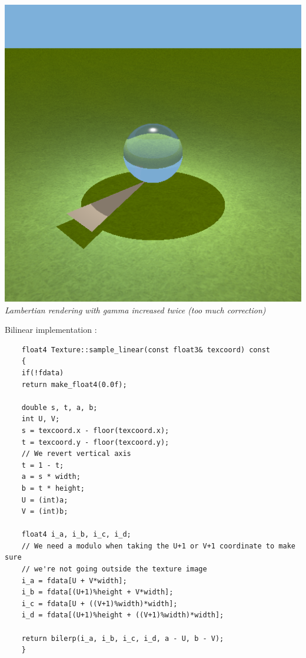 \documentclass[a4,12pt]{article}
\begin{document}
\begin{center}
\begin{minipage}[b]{0.40\linewidth}
\begin{center}
				\includegraphics[width =\textwidth]{./Worksheet3/TexturesRenderingShadowsGammaGamma.png}\\
				\textit{Lambertian rendering with gamma increased twice (too much correction)}
			\end{center}
		\end{minipage}
	\end{center}
	
	Bilinear implementation :
	\begin{lstlisting}
	float4 Texture::sample_linear(const float3& texcoord) const
	{
	if(!fdata)
	return make_float4(0.0f);
	
	double s, t, a, b;
	int U, V;
	s = texcoord.x - floor(texcoord.x);
	t = texcoord.y - floor(texcoord.y);
	// We revert vertical axis
	t = 1 - t;
	a = s * width;
	b = t * height;
	U = (int)a;
	V = (int)b;
	
	float4 i_a, i_b, i_c, i_d;
	// We need a modulo when taking the U+1 or V+1 coordinate to make sure
	// we're not going outside the texture image
	i_a = fdata[U + V*width];
	i_b = fdata[(U+1)%height + V*width];
	i_c = fdata[U + ((V+1)%width)*width];
	i_d = fdata[(U+1)%height + ((V+1)%width)*width];
	
	return bilerp(i_a, i_b, i_c, i_d, a - U, b - V);
	}
	\end{lstlisting}
	
\end{document}
